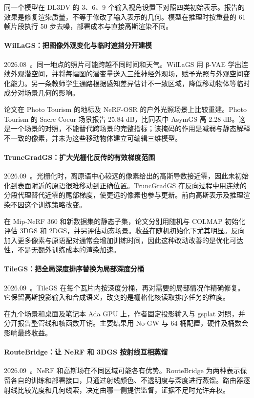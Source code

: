 同一个模型在 DL3DV 的 3、6、9 个输入视角设置下对照四类初始表示。报告的效果是修复渲染质量，不等于修改了输入表示的几何。模型在推理时按重叠的 61 帧片段执行 50 步去噪，部署成本与直接高斯渲染不同。

\paragraph{WilLaGS：把图像外观变化与临时遮挡分开建模}
2026.08~\cite{2608_28240}。同一地点的照片可能跨越不同时间和天气。WilLaGS 用 β-VAE 学出连续外观潜空间，并将每幅图的潜变量送入三维神经外观场，赋予光照与外观空间变化能力。另一条教师学生通路根据感知差异估计不一致区域，降低移动物体等临时成分对场景几何的影响。

论文在 Photo Tourism 的地标及 NeRF-OSR 的户外光照场景上比较重建。Photo Tourism 的 Sacre Coeur 场景报告 25.84 dB，比同表中 AsymGS 高 2.28 dB。这是一个场景的对照，不能替代跨场景的完整指标；该掩码的作用是减弱与静态解释不一致的像素，并未为这些移动物体建立可编辑三维模型。

\paragraph{TruncGradGS：扩大光栅化反传的有效梯度范围}
2026.09~\cite{2609_03534}。光栅化时，离原语中心较远的像素给出的高斯导数接近零，因此未初始化到表面附近的原语很难移动到正确位置。TruncGradGS 在反向过程中用连续的分段代理替代近零的尾部梯度，使更远的像素也参与更新。前向高斯表示及推理渲染不因这个训练策略改变。

在 Mip-NeRF 360 和新数据集的静态子集，论文分别用随机与 COLMAP 初始化评估 3DGS 和 2DGS，并另评估动态场景。收益在随机初始化下尤其明显。反向加入更多像素与原语配对通常会增加训练时间，因此这种改动改善的是优化可达性，不是无额外训练成本的渲染加速。

\paragraph{TileGS：把全局深度排序替换为局部深度分桶}
2026.09~\cite{2609_03613}。TileGS 在每个瓦片内按深度分桶，再对需要的局部情况作精确修复。它保留高斯投影输入和合成语义，改变的是栅格化核读取排序任务的粒度。

在九个场景和桌面及笔记本 Ada GPU 上，作者固定投影输入与 gsplat 对照，并分开报告整管线和核函数开销。主要结果用 No-GW 与 64 桶配置，硬件及桶数会影响最终收益。

\paragraph{RouteBridge：让 NeRF 和 3DGS 按射线互相蒸馏}
2026.09~\cite{2609_09606}。NeRF 和高斯场在不同区域可能各有优势。RouteBridge 为两种表示保留各自的训练和部署接口，只通过射线颜色、不透明度与深度进行蒸馏。路由器逐射线比较光度和几何线索，决定由哪一侧提供监督，证据不足时允许弃权。

